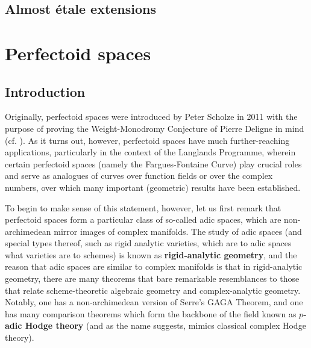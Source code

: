             \begin{definition} \label{def: almost_flatness}
            
            \end{definition}
            
        \subsection{Almost \'etale extensions}
    
    \section{Perfectoid spaces}
        \subsection{Introduction}
            Originally, perfectoid spaces were introduced by Peter Scholze in 2011 with the purpose of proving the Weight-Monodromy Conjecture of Pierre Deligne in mind (cf. \cite{scholze2011perfectoid}). As it turns out, however, perfectoid spaces have much further-reaching applications, particularly in the context of the Langlands Programme, wherein certain perfectoid spaces (namely the Fargues-Fontaine Curve) play crucial roles and serve as analogues of curves over function fields or over the complex numbers, over which many important (geometric) results have been established. 
    	    
    	    To begin to make sense of this statement, however, let us first remark that perfectoid spaces form a particular class of so-called adic spaces, which are non-archimedean mirror images of complex manifolds. The study of adic spaces (and special types thereof, such as rigid analytic varieties, which are to adic spaces what varieties are to schemes) is known as \textbf{rigid-analytic geometry}, and the reason that adic spaces are similar to complex manifolds is that in rigid-analytic geometry, there are many theorems that bare remarkable resemblances to those that relate scheme-theoretic algebraic geometry and complex-analytic geometry. Notably, one has a non-archimedean version of Serre's GAGA Theorem, and one has many comparison theorems which form the backbone of the field known as \textbf{$p$-adic Hodge theory} (and as the name suggests, mimics classical complex Hodge theory).
    	    
